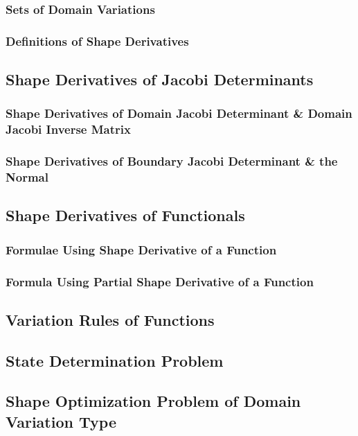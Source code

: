 \documentclass[oneside]{book}
\numberwithin{equation}{section}
\begin{document}
\subsubsection{Sets of Domain Variations}

\subsubsection{Definitions of Shape Derivatives}

\subsection{Shape Derivatives of Jacobi Determinants}

\subsubsection{Shape Derivatives of Domain Jacobi Determinant \& Domain Jacobi Inverse Matrix}

\subsubsection{Shape Derivatives of Boundary Jacobi Determinant \& the Normal}

\subsection{Shape Derivatives of Functionals}

\subsubsection{Formulae Using Shape Derivative of a Function}

\subsubsection{Formula Using Partial Shape Derivative of a Function}

\subsection{Variation Rules of Functions}

\subsection{State Determination Problem}

\subsection{Shape Optimization Problem of Domain Variation Type}
\end{document}
